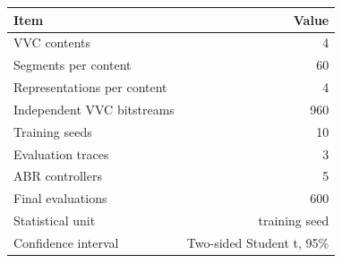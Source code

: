 \begin{tabular}{lr}
\toprule
Item & Value \\
\midrule
VVC contents & 4 \\
Segments per content & 60 \\
Representations per content & 4 \\
Independent VVC bitstreams & 960 \\
Training seeds & 10 \\
Evaluation traces & 3 \\
ABR controllers & 5 \\
Final evaluations & 600 \\
Statistical unit & training seed \\
Confidence interval & Two-sided Student t, 95\% \\
\bottomrule
\end{tabular}
